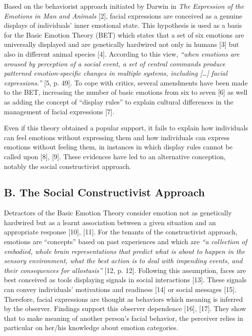 \documentclass[conference,final,]{IEEEtran}
\begin{document}
Based on the behaviorist approach initiated by Darwin in \emph{The
Expression of the Emotions in Man and Animals} {[}2{]}, facial
expressions are conceived as a genuine displays of individuals' inner
emotional state. This hypothesis is used as a basis for the Basic
Emotion Theory (BET) which states that a set of six emotions are
universally displayed and are genetically hardwired not only in humans
{[}3{]} but also in different animal species {[}4{]}. According to this
view, \emph{``when emotions are aroused by perception of a social event,
a set of central commands produce patterned emotion-specific changes in
multiple systems, including {[}\ldots{}{]} facial expressions.''} {[}5,
p. 49{]}. To cope with critics, several amendments have been made to the
BET, increasing the number of basic emotions from six to seven {[}6{]}
as well as adding the concept of ``display rules'' to explain cultural
differences in the management of facial expressions {[}7{]}.

Even if this theory obtained a popular support, it fails to explain how
individuals can feel emotions without expressing them and how
individuals can express emotions without feeling them, in instances in
which display rules cannot be called upon {[}8{]}, {[}9{]}. These
evidences have led to an alternative conception, notably the social
constructivist approach.

\hypertarget{b.-the-social-constructivist-approach}{%
\subsection{B. The Social Constructivist
Approach}\label{b.-the-social-constructivist-approach}}

Detractors of the Basic Emotion Theory consider emotion not as
genetically hardwired but as a learnt association between a given
situation and an appropriate response {[}10{]}, {[}11{]}. For the
tenants of the constructivist approach, emotions are ``concepts'' based
on past experiences and which are \emph{``a collection of embodied,
whole brain representations that predict what is about to happen in the
sensory environment, what the best action is to deal with impending
events, and their consequences for allostasis''} {[}12, p. 12{]}.
Following this assumption, faces are best conceived as tools displaying
signals in social interactions {[}13{]}. These signals can convey
individuals' motivations and readiness {[}14{]} or social messages
{[}15{]}. Therefore, facial expressions are thought as behaviors which
meaning is inferred by the observer. Findings support this observer
dependence {[}16{]}, {[}17{]}. They show that to make meaning of another
person's facial behavior, the perceiver relies in particular on her/his
knowledge about emotion categories.
\end{document}
